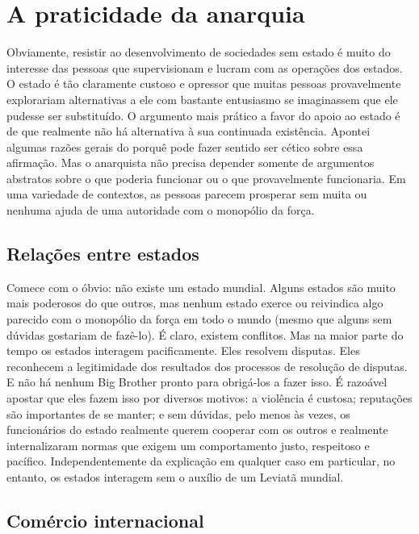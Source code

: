 \section{A praticidade da anarquia}

Obviamente, resistir ao desenvolvimento de sociedades sem estado é muito do interesse das pessoas que supervisionam e lucram com as operações dos estados. O estado é tão claramente custoso e opressor que muitas pessoas provavelmente explorariam alternativas a ele com bastante entusiasmo se imaginassem que ele pudesse ser substituído. O argumento mais prático a favor do apoio ao estado é de que realmente não há alternativa à sua continuada existência. Apontei algumas razões gerais do porquê pode fazer sentido ser cético sobre essa afirmação. Mas o anarquista não precisa depender somente de argumentos abstratos sobre o que poderia funcionar ou o que provavelmente funcionaria. Em uma variedade de contextos, as pessoas parecem prosperar sem muita ou nenhuma ajuda de uma autoridade com o monopólio da força.

\subsection*{Relações entre estados}

Comece com o óbvio: não existe um estado mundial. Alguns estados são muito mais poderosos do que outros, mas nenhum estado exerce ou reivindica algo parecido com o monopólio da força em todo o mundo (mesmo que alguns sem dúvidas gostariam de fazê-lo). É claro, existem conflitos. Mas na maior parte do tempo os estados interagem pacificamente. Eles resolvem disputas. Eles reconhecem a legitimidade dos resultados dos processos de resolução de disputas. E não há nenhum Big Brother pronto para obrigá-los a fazer isso. É razoável apostar que eles fazem isso por diversos motivos: a violência é custosa; reputações são importantes de se manter; e sem dúvidas, pelo menos às vezes, os funcionários do estado realmente querem cooperar com os outros e realmente internalizaram normas que exigem um comportamento justo, respeitoso e pacífico. Independentemente da explicação em qualquer caso em particular, no entanto, os estados interagem sem o auxílio de um Leviatã mundial.

\subsection*{Comércio internacional}

